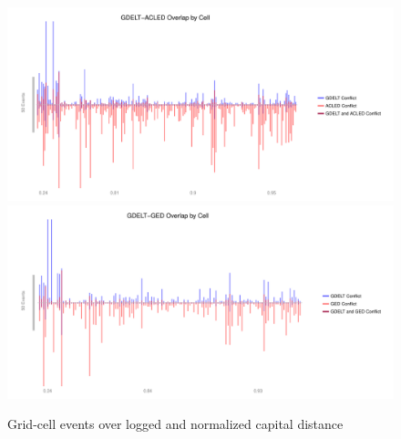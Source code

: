 \documentclass[hidelinks]{article}
\begin{document}
\begin{figure}[!htbp]
\includegraphics[width = 1 \textwidth]{spaceACLEDa3.pdf}\\
\includegraphics[width = 1 \textwidth]{spaceGEDa3.pdf}
\caption{Grid-cell events over logged and normalized capital distance}\label{fig:correlations_space}
\end{figure}
\newpage
\end{document}
